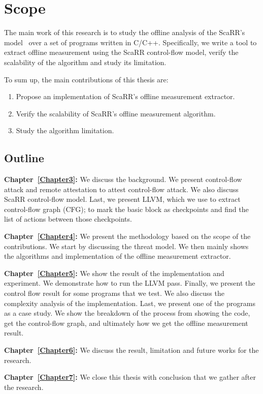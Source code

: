 
\chapter{Scope} %
\label{Chapter2} %

The main work of this research is to study the offline analysis of the ScaRR's
model~\cite{toffaliniScaRRScalableRuntime2019} over a set of programs written in
C/C++. Specifically, we write a tool to extract offline measurement using the
ScaRR control-flow model, verify the scalability of the algorithm and study its
limitation.

To sum up, the main contributions of this thesis are:
\begin{enumerate}
	\item Propose an implementation of ScaRR's offline measurement extractor.
	\item Verify the scalability of ScaRR's offline measurement algorithm.
	\item Study the algorithm limitation.
\end{enumerate}

\section{Outline}
\label{sec:outline}

\vspace{0.5cm}
\noindent \textbf{Chapter~\ref{Chapter3}:} We discuss the background. We present
control-flow attack and remote attestation to attest control-flow attack. We
also discuss ScaRR control-flow model. Last, we present LLVM, which we use to
extract control-flow graph (CFG); to mark the basic block as checkpoints and
find the list of actions between those checkpoints.

\vspace{0.5cm}
\noindent \textbf{Chapter~\ref{Chapter4}:} We present the methodology based on
the scope of the contributions. We start by discussing the threat model. We then
mainly shows the algorithms and implementation of the offline measurement
extractor.

\vspace{0.5cm}
\noindent \textbf{Chapter~\ref{Chapter5}:} We show the result of the
implementation and experiment. We demonstrate how to run the LLVM pass. Finally,
we present the control flow result for some programs that we test. We also
discuss the complexity analysis of the implementation. Last, we present one of
the programs as a case study. We show the breakdown of the process from showing
the code, get the control-flow graph, and ultimately how we get the offline
measurement result.

\vspace{0.5cm}
\noindent \textbf{Chapter~\ref{Chapter6}:} We discuss the result, limitation and
future works for the research.

\vspace{0.5cm}
\noindent \textbf{Chapter~\ref{Chapter7}:} We close this thesis with conclusion
that we gather after the research.